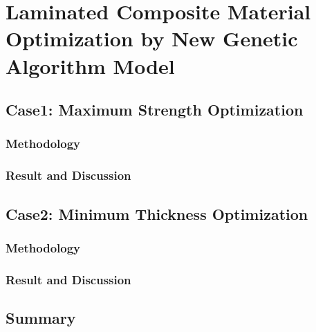 
\chapter{Laminated Composite Material Optimization by New Genetic Algorithm Model} %

\label{Chapter4} %


\section{Case1: Maximum Strength Optimization}
\subsection{Methodology}
\subsection{Result and Discussion}

\section{Case2: Minimum Thickness Optimization}
\subsection{Methodology}
\subsection{Result and Discussion}
\section{Summary}

